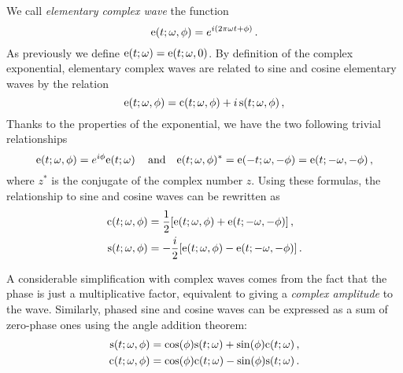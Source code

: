\begin{definition}
  We call \emph{elementary complex wave} the function
  \begin{equation}
    \mathrm{e}(t;\omega,\phi)=e^{i(2\pi\omega t + \phi)}\,.
  \end{equation}
  As previously we define $\mathrm{e}(t;\omega)=\mathrm{e}(t;\omega,0)$. By definition of the complex
  exponential, elementary complex waves are related to sine and cosine elementary waves by
  the relation
  \begin{equation}
    \mathrm{e}(t;\omega,\phi)=\mathrm{c}(t;\omega,\phi)+i\,\mathrm{s}(t;\omega,\phi)\,,
  \end{equation}
  Thanks to the properties of the exponential, we have the two following trivial
  relationships
  \begin{equation}
    \mathrm{e}(t;\omega,\phi)=e^{i\phi}\mathrm{e}(t;\omega)\,\quad\text{and}\quad
    \mathrm{e}(t;\omega,\phi)^*=\mathrm{e}(-t;\omega,-\phi)=\mathrm{e}(t;-\omega,-\phi)\,,\label{eq:cw-conj}
  \end{equation}
  where $z^*$ is the conjugate of the complex number $z$. Using these formulas, the relationship to sine and cosine waves can be rewritten as
  \begin{align}
    \mathrm{c}(t;\omega,\phi)&=\frac{1}{2}[\mathrm{e}(t;\omega,\phi)+\mathrm{e}(t;-\omega,-\phi)]\,,\label{eq:cwtoew}\\
    \mathrm{s}(t;\omega,\phi)&=-\frac{i}{2}[\mathrm{e}(t;\omega,\phi)-\mathrm{e}(t;-\omega,-\phi)]\,.\label{eq:swtoew}
  \end{align}
\end{definition}

A considerable simplification with complex waves comes from the fact that the phase is
just a multiplicative factor, equivalent to giving a \emph{complex amplitude} to the wave.
Similarly, phased sine and cosine waves can be expressed as a sum of zero-phase ones
using the angle addition theorem:
\begin{align}
  \mathrm{s}(t;\omega,\phi)&=\cos(\phi)\mathrm{s}(t;\omega)+\sin(\phi)\mathrm{c}(t;\omega)\,,\\
  \mathrm{c}(t;\omega,\phi)&=\cos(\phi)\mathrm{c}(t;\omega)-\sin(\phi)\mathrm{s}(t;\omega)\,.
\end{align}

